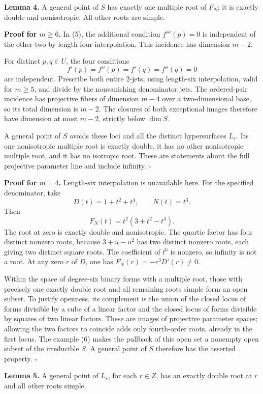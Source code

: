 \documentclass[
  11pt,
]{article}
\begin{document}
\textbf{Lemma 4.} A general point of \(S\) has exactly one multiple root
of \(F_N\); it is exactly double and nonisotropic. All other roots are
simple.

\textbf{Proof for \(m\ge6\).} In (5), the additional condition
\(f'''(p)=0\) is independent of the other two by length-four
interpolation. This incidence has dimension \(m-2\).

For distinct \(p,q\in U\), the four conditions \[
 f'(p)=f''(p)=f'(q)=f''(q)=0
\] are independent. Prescribe both entire 2-jets, using length-six
interpolation, valid for \(m\ge5\), and divide by the nonvanishing
denominator jets. The ordered-pair incidence has projective fibers of
dimension \(m-4\) over a two-dimensional base, so its total dimension is
\(m-2\). The closures of both exceptional images therefore have
dimension at most \(m-2\), strictly below \(\dim S\).

A general point of \(S\) avoids these loci and all the distinct
hypersurfaces \(L_r\). Its one nonisotropic multiple root is exactly
double, it has no other nonisotropic multiple root, and it has no
isotropic root. These are statements about the full projective parameter
line and include infinity. \(\square\)

\textbf{Proof for \(m=4\).} Length-six interpolation is unavailable
here. For the specified denominator, take \[
 D(t)=1+t^2+t^4,\qquad N(t)=t^3.
\] Then \[
 F_N(t)=t^2(3+t^2-t^4).
 \tag{6}
\] The root at zero is exactly double and nonisotropic. The quartic
factor has four distinct nonzero roots, because \(3+u-u^2\) has two
distinct nonzero roots, each giving two distinct square roots. The
coefficient of \(t^6\) is nonzero, so infinity is not a root. At any
zero \(r\) of \(D\), one has \(F_N(r)=-r^3D'(r)\ne0\).

Within the space of degree-six binary forms with a multiple root, those
with precisely one exactly double root and all remaining roots simple
form an open subset. To justify openness, its complement is the union of
the closed locus of forms divisible by a cube of a linear factor and the
closed locus of forms divisible by squares of two linear factors. These
are images of projective parameter spaces; allowing the two factors to
coincide adds only fourth-order roots, already in the first locus. The
example (6) makes the pullback of this open set a nonempty open subset
of the irreducible \(S\). A general point of \(S\) therefore has the
asserted property. \(\square\)

\textbf{Lemma 5.} A general point of \(L_r\), for each \(r\in Z\), has
an exactly double root at \(r\) and all other roots simple.
\end{document}
